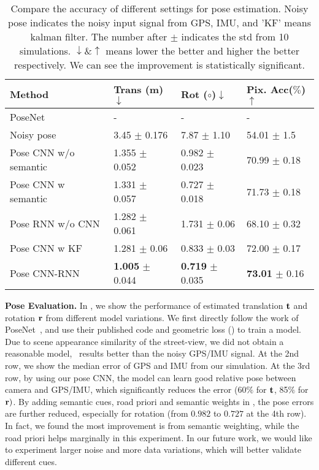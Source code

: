 \begin{table}
\vspace{-0\baselineskip}
\center
\fontsize{7}{8}\selectfont
\hspace*{-0.33cm}
\begin{tabular}{llll}
\toprule[0.1 em]
Method & Trans (m) $\downarrow$ & Rot ($\circ$)$\downarrow$  & Pix. Acc($\%$)$\uparrow$ \\
\hline
PoseNet~\cite{kendall2017geometric} & -  & -  & -  \\
Noisy pose & 3.45 $\pm$ 0.176 & 7.87 $\pm$ 1.10 & 54.01 $\pm$ 1.5 \\
Pose CNN w/o semantic & 1.355 $\pm$ 0.052  & 0.982 $\pm$ 0.023 & 70.99 $\pm$ 0.18 \\
Pose CNN w semantic & 1.331 $\pm$ 0.057  & 0.727 $\pm$ 0.018 & 71.73 $\pm$ 0.18  \\
Pose RNN w/o CNN & 1.282 $\pm$ 0.061  & 1.731 $\pm$ 0.06 &  68.10 $\pm$ 0.32 \\
Pose CNN w KF & 1.281 $\pm$ 0.06  & 0.833 $\pm$ 0.03 & 72.00 $\pm$ 0.17  \\
Pose CNN-RNN  & \textbf{1.005} $\pm$ 0.044  & \textbf{0.719} $\pm$ 0.035  & \textbf{73.01} $\pm$ 0.16  \\
\toprule[0.1 em]
\end{tabular}
\caption{Compare the accuracy of different settings for pose estimation.
Noisy pose indicates the noisy input signal from GPS, IMU, and 'KF' means kalman filter.
The number after $\pm$ indicates the std from 10 simulations. $\downarrow \& \uparrow$ means lower the better and higher the better respectively. 
We can see the improvement is statistically significant.}
\label{tbl:pose}
\vspace{-1.5\baselineskip}
\end{table}

\textbf{Pose Evaluation.}
In , we show the performance of estimated translation ${\mathbf t}$ and rotation ${\mathbf r}$ from different model variations. We first directly follow the work of PoseNet~\cite{Kendall_2015_ICCV,kendall2017geometric}, and use their published code and geometric loss () to train a model. 
Due to scene appearance similarity of the street-view, we did not obtain a reasonable model, \ie~results better than the noisy GPS/IMU signal.
At the 2nd row, we show the median error of GPS and IMU from our simulation. 
At the 3rd row, by using our pose CNN, the model can learn good relative pose between camera and GPS/IMU, which significantly reduces the error (60$\%$ for ${\mathbf t}$, 85$\%$ for ${\mathbf r})$. 
By adding semantic cues, \ie road priori and semantic weights in , the pose errors are further reduced, especially for rotation (from $0.982$ to $0.727$ at the 4th row). In fact, we found the most improvement is from semantic weighting, while the road priori helps marginally in this experiment. In our future work, we would like to experiment larger noise and more data variations, which will better validate different cues.

